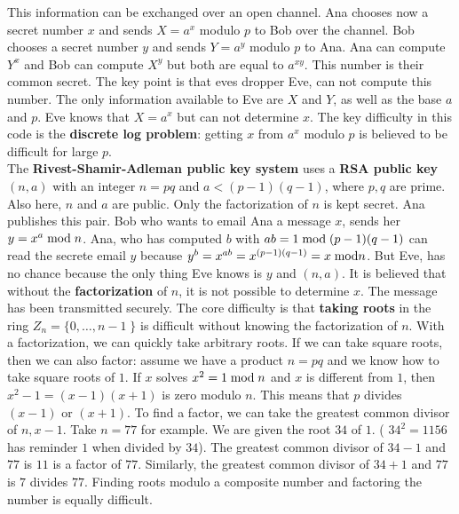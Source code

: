 \documentclass[12pt]{amsart}
\newcounter{example}    \def\example#1{ \item \fontsize{12}{15} \selectfont #1 \fontsize{12}{15} \selectfont }
\begin{document}
This information can be exchanged over an open channel.
Ana chooses now a secret number $x$ and sends $X=a^x$ modulo $p$ to Bob
over the channel. Bob chooses a secret number $y$ and sends $Y=a^y$ modulo $p$ 
to Ana. Ana can compute $Y^x$ and Bob can compute $X^y$ but both are equal to $a^{x y}$. 
This number is their common secret. The key point is that eves dropper Eve, can not compute this number. The
only information available to Eve are $X$ and $Y$, as well as the base $a$ and $p$. Eve knows that
$X=a^x$ but can not determine $x$. The key difficulty in this code is the  {\bf discrete log problem}: 
getting $x$ from $a^x$ modulo $p$ is believed to be difficult for large $p$. \\
The {\bf Rivest-Shamir-Adleman public key system} uses
a {\bf RSA public key} $(n,a)$ with an integer $n=pq$ and $a<(p-1) (q-1)$, where $p,q$ are prime. 
Also here, $n$ and $a$ are public. Only the factorization of $n$ is 
kept secret. Ana publishes this pair. Bob who wants to email Ana a message $x$, sends her 
$y = x^a \; {\rm mod} \; n$. Ana, who has computed $b$ with 
$ab = 1 \; {\rm mod} \; (p-1)(q-1)$ can read the secrete email $y$ because
$y^b = x^{a b} = x^{(p-1) (q-1)} = x \; {\rm mod} n$.
But Eve, has no chance because the only thing Eve knows is
$y$ and $(n,a)$. It is believed that without the {\bf factorization} of $n$, it is not 
possible to determine $x$. The message has been transmitted securely.
The core difficulty is that {\bf taking roots} in the ring 
$Z_n = \{ 0, \dots ,n-1 \; \}$ is difficult without knowing the factorization of $n$. 
With a factorization, we can quickly take arbitrary roots. 
If we can take square roots, then we can also factor: assume we have a 
product $n=pq$ and we know how to take square roots of $1$. 
If $x$ solves $x^2=1 \; {\rm mod} \; n$ and $x$ is different from $1$, then 
$x^2-1= (x-1) (x+1)$ is zero modulo $n$. This means that $p$ divides $(x-1)$ or $(x+1)$. 
To find a factor, we can take the greatest common divisor of $n,x-1$. 
Take $n=77$ for example. We are given the root $34$ of $1$. ( $34^2 = 1156$ has reminder $1$ when 
divided by $34$). The greatest common divisor of $34-1$ and $77$ is $11$ is a factor of $77$. 
Similarly, the greatest common divisor of $34+1$ and $77$ is $7$ divides $77$. Finding roots
modulo a composite number and factoring the number is equally difficult.  
\end{document}
